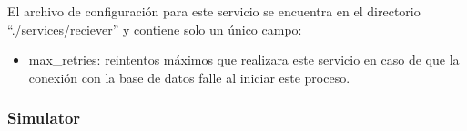 El archivo de configuración para este servicio se encuentra en el directorio ``./services/reciever'' y 
contiene solo un único campo:
\begin{itemize}
    \item max\_retries: reintentos máximos que realizara este servicio en caso de que la conexión con 
        la base de datos falle al iniciar este proceso.
\end{itemize}

\subsubsection{Simulator}

